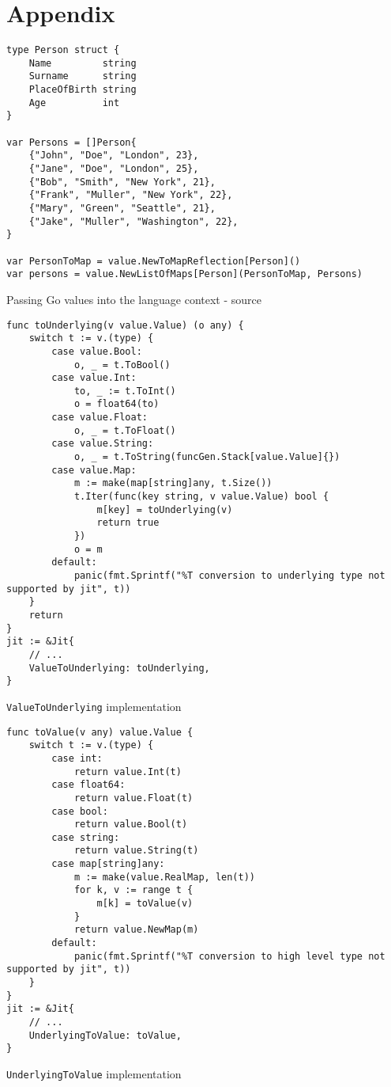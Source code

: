 \chapter{Appendix}

\begin{listing}[H]
    \begin{verbatim}
type Person struct {
	Name         string
	Surname      string
	PlaceOfBirth string
	Age          int
}

var Persons = []Person{
	{"John", "Doe", "London", 23},
	{"Jane", "Doe", "London", 25},
	{"Bob", "Smith", "New York", 21},
	{"Frank", "Muller", "New York", 22},
	{"Mary", "Green", "Seattle", 21},
	{"Jake", "Muller", "Washington", 22},
}

var PersonToMap = value.NewToMapReflection[Person]()
var persons = value.NewListOfMaps[Person](PersonToMap, Persons)
    \end{verbatim}
    \caption{Passing Go values into the language context - source \cite{parser2_xnacly}}
    \label{code:go-to-language-interop}
\end{listing}

\begin{listing}[H]
    \begin{verbatim}
func toUnderlying(v value.Value) (o any) {
    switch t := v.(type) {
        case value.Bool:
            o, _ = t.ToBool()
        case value.Int:
            to, _ := t.ToInt()
            o = float64(to)
        case value.Float:
            o, _ = t.ToFloat()
        case value.String:
            o, _ = t.ToString(funcGen.Stack[value.Value]{})
        case value.Map:
            m := make(map[string]any, t.Size())
            t.Iter(func(key string, v value.Value) bool {
                m[key] = toUnderlying(v)
                return true
            })
            o = m
        default:
            panic(fmt.Sprintf("%T conversion to underlying type not supported by jit", t))
    }
    return
}
jit := &Jit{
    // ...
    ValueToUnderlying: toUnderlying,
}
    \end{verbatim}
    \caption{\texttt{ValueToUnderlying} implementation}
    \label{code:type-clashes-impl-tounderlying}
\end{listing}

\begin{listing}[H]
    \begin{verbatim}
func toValue(v any) value.Value {
    switch t := v.(type) {
        case int:
            return value.Int(t)
        case float64:
            return value.Float(t)
        case bool:
            return value.Bool(t)
        case string:
            return value.String(t)
        case map[string]any:
            m := make(value.RealMap, len(t))
            for k, v := range t {
                m[k] = toValue(v)
            }
            return value.NewMap(m)
        default:
            panic(fmt.Sprintf("%T conversion to high level type not supported by jit", t))
    }
}
jit := &Jit{
    // ...
    UnderlyingToValue: toValue,
}
    \end{verbatim}
    \caption{\texttt{UnderlyingToValue} implementation}
    \label{code:type-clashes-impl-tovalue}
\end{listing}
